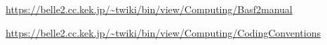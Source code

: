 \begin{thebibliography}{99}

\url{https://belle2.cc.kek.jp/~twiki/bin/view/Computing/Basf2manual}

\url{https://belle2.cc.kek.jp/~twiki/bin/view/Computing/CodingConventions}
 
\end{thebibliography}
